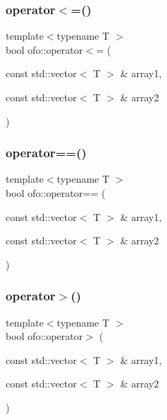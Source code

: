 \mbox{\label{namespaceofo_a248e627fce31919f3453b83efddaf1ab}} 
\subsubsection{\texorpdfstring{operator$<$=()}{operator<=()}}
{\footnotesize\ttfamily template$<$typename T $>$ \\
bool ofo\+::operator$<$= (\begin{DoxyParamCaption}\item[{const std\+::vector$<$ T $>$ \&}]{array1,  }\item[{const std\+::vector$<$ T $>$ \&}]{array2 }\end{DoxyParamCaption})}

\mbox{\label{namespaceofo_ac9b79c838072eb36ce92e234b0b4dc81}} 
\subsubsection{\texorpdfstring{operator==()}{operator==()}}
{\footnotesize\ttfamily template$<$typename T $>$ \\
bool ofo\+::operator== (\begin{DoxyParamCaption}\item[{const std\+::vector$<$ T $>$ \&}]{array1,  }\item[{const std\+::vector$<$ T $>$ \&}]{array2 }\end{DoxyParamCaption})}

\mbox{\label{namespaceofo_a5721f395418c99bbb91789f73f6fe7e4}} 
\subsubsection{\texorpdfstring{operator$>$()}{operator>()}}
{\footnotesize\ttfamily template$<$typename T $>$ \\
bool ofo\+::operator$>$ (\begin{DoxyParamCaption}\item[{const std\+::vector$<$ T $>$ \&}]{array1,  }\item[{const std\+::vector$<$ T $>$ \&}]{array2 }\end{DoxyParamCaption})}

